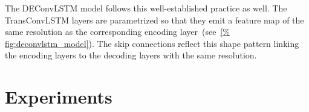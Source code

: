 The DEConvLSTM model follows this well-established practice as well. The
TransConvLSTM layers are parametrized so that they emit a feature map of the
same resolution as the corresponding encoding layer~(see~\autoref{%
fig:deconvlstm_model}). The skip connections reflect this shape pattern linking
the encoding layers to the decoding layers with the same resolution.


\section{Experiments}\label{sec:deconvLSTM_experiments}
%
%


